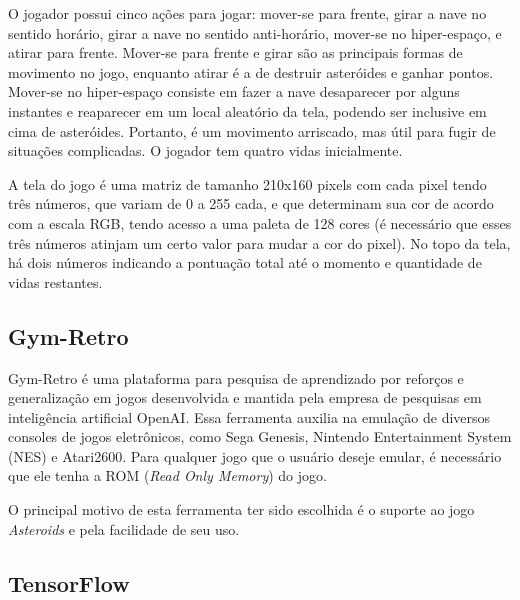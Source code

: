 O jogador possui cinco ações para jogar: mover-se para frente, girar a nave no sentido horário, girar a nave no sentido anti-horário, mover-se no hiper-espaço, e atirar para frente.
Mover-se para frente e girar são as principais formas de movimento no jogo, enquanto atirar é a de destruir asteróides e ganhar pontos.
Mover-se no hiper-espaço consiste em fazer a nave desaparecer por alguns instantes e reaparecer em um local aleatório da tela, podendo ser inclusive em cima de asteróides.
Portanto, é um movimento arriscado, mas útil para fugir de situações complicadas.
O jogador tem quatro vidas inicialmente.

A tela do jogo é uma matriz de tamanho 210x160 pixels com cada pixel tendo três números, que variam de 0 a 255 cada, e que determinam sua cor de acordo com a escala RGB, tendo acesso a uma paleta de 128 cores (é necessário que esses três números atinjam um certo valor para mudar a cor do pixel).
No topo da tela, há dois números indicando a pontuação total até o momento e quantidade de vidas restantes.



\subsection{Gym-Retro}
\label{sec:gymretro}

Gym-Retro é uma plataforma para pesquisa de aprendizado por reforços e generalização em jogos desenvolvida e mantida pela empresa de pesquisas em inteligência artificial OpenAI. Essa ferramenta auxilia na emulação de diversos consoles de jogos eletrônicos, como Sega Genesis, Nintendo Entertainment System (NES) e Atari2600. Para qualquer jogo que o usuário deseje emular, é necessário que ele tenha a ROM (\textit{Read Only Memory}) do jogo.

O principal motivo de esta ferramenta ter sido escolhida é o suporte ao jogo \textit{Asteroids} e pela facilidade de seu uso.
\subsection{TensorFlow}
\label{sec:tensorflow}

